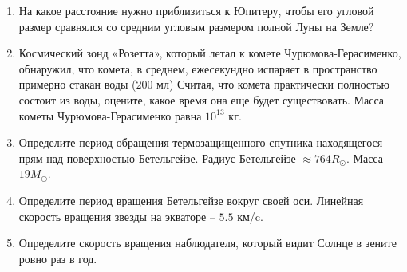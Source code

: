 \documentclass[12pt]{article}
\begin{document}
\begin{enumerate}[label=\textbf{E\arabic*.}]
	\item На какое расстояние нужно приблизиться к Юпитеру, чтобы его угловой размер сравнялся со средним угловым размером полной Луны на Земле? %
    \item Космический зонд «Розетта», который летал к комете Чурюмова-Герасименко, обнаружил, что комета, в среднем, ежесекундно испаряет в пространство примерно стакан воды ($200$ мл) Считая, что комета практически полностью состоит из воды, оцените, какое время она еще будет существовать. Масса кометы Чурюмова-Герасименко равна $10^{13}$ кг. %
    \item Определите период обращения термозащищенного спутника находящегося прям над поверхностью Бетельгейзе. Радиус Бетельгейзе $\approx 764 R_{\odot}$. Масса -- $19 M_{\odot}$. %
    \item Определите период вращения Бетельгейзе вокруг своей оси. Линейная скорость вращения звезды на экваторе -- $5.5$ км/c. %
    \item Определите скорость вращения наблюдателя, который видит Солнце в зените ровно раз в год. %
\end{enumerate}
\end{document}
